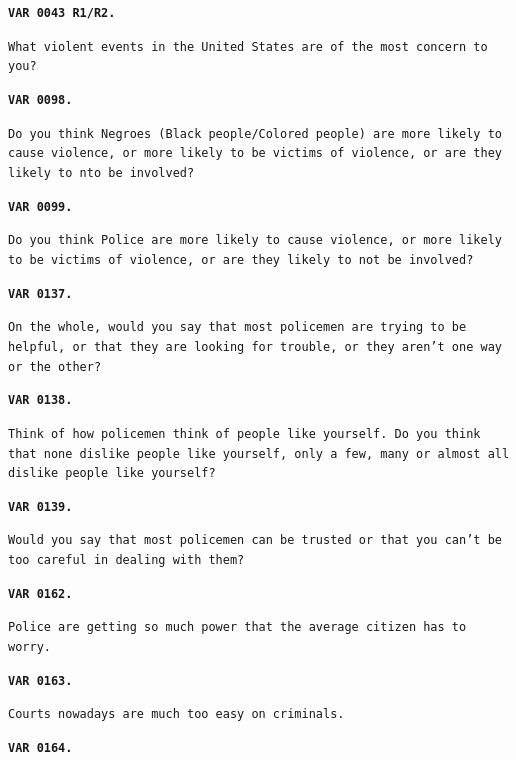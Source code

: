 \documentclass[12pt]{article}
\newenvironment{shift}{\begin{adjustwidth}{1cm}{}}{\end{adjustwidth}}
\begin{document}
	 \vspace{.1in}
	 \begin{shift}
		 \vspace{.05in}
		 \texttt{\textbf{VAR 0043 R1/R2.}}

		 \texttt{What violent events in the United States are of the most concern to you? }


		 \vspace{.05in}
 		\texttt{\textbf{VAR 0098.}}

 		\texttt{Do you think Negroes (Black people/Colored people) are more likely to cause violence, or more likely to be victims of violence, or are they likely to nto be involved?}


 		\vspace{.05in}
 		\texttt{\textbf{VAR 0099.}}

 		\texttt{Do you think Police are more likely to cause violence, or more likely to be victims of violence, or are they likely to not be involved?}

 		\vspace{.05in}
 		\texttt{\textbf{VAR 0137.}}

 		\texttt{On the whole, would you say that most policemen are trying to be helpful, or that they are looking for trouble, or they aren't one way or the other?}

 		\vspace{.05in}
 		\texttt{\textbf{VAR 0138.}}

 		\texttt{Think of how policemen think of people like yourself.  Do you think that none dislike people like yourself, only a few, many or almost all dislike people like yourself?}

 		\vspace{.05in}
 		\texttt{\textbf{VAR 0139.}}

 		\texttt{Would you say that most policemen can be trusted or that you can't be too careful in dealing with them?}

		\vspace{.05in}
 		\texttt{\textbf{VAR 0162.}}

 		\texttt{Police are getting so much power that the average citizen has to worry.}


		\vspace{.05in}
 		\texttt{\textbf{VAR 0163.}}

 		\texttt{Courts nowadays are much too easy on criminals.}

		\vspace{.05in}
 		\texttt{\textbf{VAR 0164.}}


\end{shift}
\end{document}
